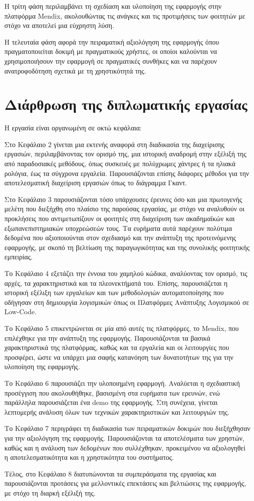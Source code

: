 		Η τρίτη φάση περιλαμβάνει τη σχεδίαση και υλοποίηση της εφαρμογής στην πλατφόρμα Mendix, ακολουθώντας τις ανάγκες και τις προτιμήσεις των φοιτητών με στόχο να αποτελεί μια εύχρηστη λύση.

		Η τελευταία φάση αφορά την πειραματική αξιολόγηση της εφαρμογής όπου πραγματοποιείται δοκιμή με πραγματικούς χρήστες, οι οποίοι καλούνται να χρησιμοποιήσουν την εφαρμογή σε πραγματικές συνθήκες και να παρέχουν ανατροφοδότηση σχετικά με τη χρηστικότητά της.


	\section{Διάρθρωση της διπλωματικής εργασίας}
		Η εργασία είναι οργανωμένη σε οκτώ κεφάλαια:

		Στο Κεφάλαιο 2 γίνεται μια εκτενής αναφορά στη διαδικασία της διαχείρισης εργασιών, περιλαμβάνοντας τον ορισμό της, μια ιστορική αναδρομή στην εξέλιξή της από παραδοσιακές μεθόδους, όπως συσκευές με πολύχρωμες χάντρες ή τα ηλιακά ρολόγια, έως τα σύγχρονα εργαλεία. Παρουσιάζονται επίσης διάφορες μέθοδοι για την αποτελεσματική διαχείριση εργασιών όπως το διάγραμμα Γκαντ.

		Στο Κεφάλαιο 3 παρουσιάζονται τόσο υπάρχουσες έρευνες όσο και μια πρωτογενής μελέτη που διεξήχθη στο πλαίσιο της παρούσας εργασίας, με στόχο να αναλυθούν οι προκλήσεις που αντιμετωπίζουν οι φοιτητές στη διαχείριση των ακαδημαϊκών και εξωπανεπιστημιακών υποχρεώσεών τους. Τα ευρήματα αυτά παρέχουν πολύτιμα δεδομένα που αξιοποιούνται στον σχεδιασμό και την ανάπτυξη της προτεινόμενης εφαρμογής, με σκοπό τη βελτίωση της παραγωγικότητας και της συνολικής φοιτητικής εμπειρίας.

		Το Κεφάλαιο 4 εξετάζει την έννοια του χαμηλού κώδικα, αναλύοντας τον ορισμό, τις αρχές, τα χαρακτηριστικά και τα πλεονεκτήματά του. Επίσης, παρουσιάζεται η ιστορική εξέλιξη των εργαλείων και των μεθοδολογιών αυτοματοποίησης που οδήγησαν στη δημιουργία λογισμικών όπως οι Πλατφόρμες Ανάπτυξης Λογισμικού σε Low-Code.

		Το Κεφάλαιο 5 επικεντρώνεται σε μία από αυτές τις πλατφόρμες, το Mendix, που επιλέχθηκε για την ανάπτυξη της εφαρμογής. Παρουσιάζονται τα βασικά χαρακτηριστικά της πλατφόρμας, καθώς και τα εργαλεία και οι λειτουργίες που προσφέρει, ώστε να υπάρχει μια σαφής κατανόηση των δυνατοτήτων της για την υλοποίηση της εφαρμογής.

		Το Κεφάλαιο 6 παρουσιάζει την υλοποιημένη εφαρμογή. Αναλύεται η σχεδιαστική προσέγγιση που ακολουθήθηκε, βασισμένη στα ευρήματα των ερευνών, ενώ παράλληλα παρουσιάζεται ένα demo της εφαρμογής. Στη συνέχεια, γίνεται λεπτομερής ανάλυση όλων των τεχνικών χαρακτηριστικών και λειτουργιών της.

		Το Κεφάλαιο 7 περιγράφει τη διαδικασία των πειραματικών δοκιμών που διεξήχθησαν για την αξιολόγηση της εφαρμογής. Παρουσιάζονται τα αποτελέσματα των χρηστών, καθώς και η ανάλυση των δεδομένων που συλλέχθηκαν, προκειμένου να αξιολογηθεί η αποτελεσματικότητα και η χρηστικότητα του συστήματος.

		Τέλος, στο Κεφάλαιο 8 διατυπώνονται τα συμπεράσματα της εργασίας και παρουσιάζονται προτάσεις για μελλοντικές επεκτάσεις και βελτιώσεις της εφαρμογής, με στόχο τη διαρκή εξέλιξή της.
